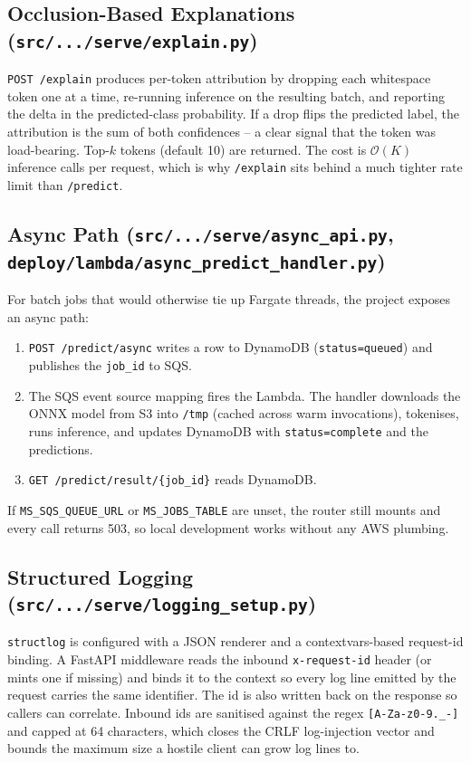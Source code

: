 \documentclass[11pt,a4paper]{article}
\begin{document}
\subsection{Occlusion-Based Explanations (\texttt{src/.../serve/explain.py})}

\texttt{POST /explain} produces per-token attribution by dropping each whitespace
token one at a time, re-running inference on the resulting batch, and reporting the
delta in the predicted-class probability. If a drop flips the predicted label, the
attribution is the sum of both confidences -- a clear signal that the token was
load-bearing. Top-$k$ tokens (default 10) are returned. The cost is $\mathcal{O}(K)$
inference calls per request, which is why \texttt{/explain} sits behind a much
tighter rate limit than \texttt{/predict}.

\subsection{Async Path (\texttt{src/.../serve/async\_api.py},
                       \texttt{deploy/lambda/async\_predict\_handler.py})}

For batch jobs that would otherwise tie up Fargate threads, the project exposes an
async path:

\begin{enumerate}[leftmargin=*]
\item \texttt{POST /predict/async} writes a row to DynamoDB (\texttt{status=queued})
      and publishes the \texttt{job\_id} to SQS.
\item The SQS event source mapping fires the Lambda. The handler downloads the ONNX
      model from S3 into \texttt{/tmp} (cached across warm invocations), tokenises,
      runs inference, and updates DynamoDB with \texttt{status=complete} and the
      predictions.
\item \texttt{GET /predict/result/\{job\_id\}} reads DynamoDB.
\end{enumerate}

If \texttt{MS\_SQS\_QUEUE\_URL} or \texttt{MS\_JOBS\_TABLE} are unset, the router
still mounts and every call returns 503, so local development works without any
AWS plumbing.

\subsection{Structured Logging (\texttt{src/.../serve/logging\_setup.py})}

\texttt{structlog} is configured with a JSON renderer and a contextvars-based
request-id binding. A FastAPI middleware reads the inbound \texttt{x-request-id}
header (or mints one if missing) and binds it to the context so every log line
emitted by the request carries the same identifier. The id is also written back on
the response so callers can correlate. Inbound ids are sanitised against the regex
\texttt{[A-Za-z0-9.\_-]} and capped at 64 characters, which closes the CRLF
log-injection vector and bounds the maximum size a hostile client can grow log
lines to.
\end{document}
